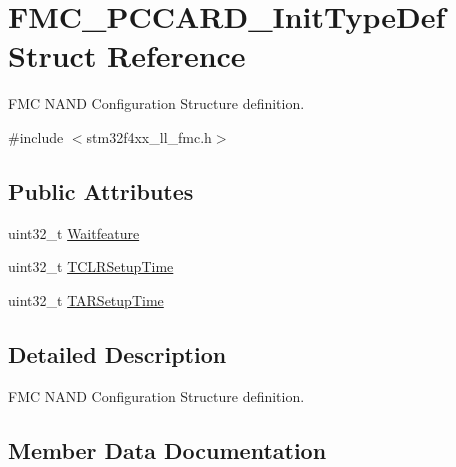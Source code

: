 \hypertarget{struct_f_m_c___p_c_c_a_r_d___init_type_def}{}\section{F\+M\+C\+\_\+\+P\+C\+C\+A\+R\+D\+\_\+\+Init\+Type\+Def Struct Reference}
\label{struct_f_m_c___p_c_c_a_r_d___init_type_def}


F\+MC N\+A\+ND Configuration Structure definition.  




{\ttfamily \#include $<$stm32f4xx\+\_\+ll\+\_\+fmc.\+h$>$}

\subsection*{Public Attributes}
\begin{DoxyCompactItemize}
\item 
uint32\+\_\+t \hyperlink{struct_f_m_c___p_c_c_a_r_d___init_type_def_a84d52bc62cc1cf37523fe42418bdb159}{Waitfeature}
\item 
uint32\+\_\+t \hyperlink{struct_f_m_c___p_c_c_a_r_d___init_type_def_a5cea83326b45ca6f2efdd906d47b9253}{T\+C\+L\+R\+Setup\+Time}
\item 
uint32\+\_\+t \hyperlink{struct_f_m_c___p_c_c_a_r_d___init_type_def_a146ea5d7f4dadc6745c0f14069b02b25}{T\+A\+R\+Setup\+Time}
\end{DoxyCompactItemize}


\subsection{Detailed Description}
F\+MC N\+A\+ND Configuration Structure definition. 

\subsection{Member Data Documentation}
